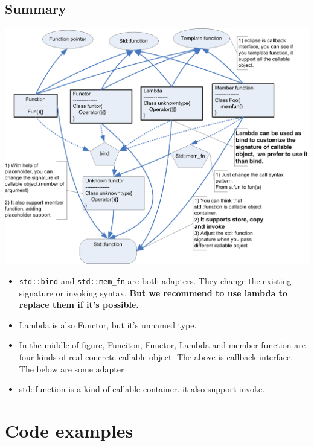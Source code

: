 \documentclass[a4paper,11pt,twoside]{book}
\begin{document}
\subsection{Summary}


\begin{center}
	\includegraphics[width=0.95\linewidth]{pics/callable.png}
\end{center}
	
	


\begin{itemize}
\item \texttt{std::bind} and \texttt{std::mem\_fn} are both adapters. They change the existing signature or invoking syntax. \textbf{But we recommend to use lambda to replace them if it's possible.}


\item Lambda is also Functor, but it's unnamed type.

\item In the middle of figure, Funciton, Functor, Lambda and member function are four kinds of real concrete callable object. The above is callback interface. The below are some adapter 

\item std::function is a kind of callable container. it also support invoke.
\end{itemize}

\section{Code examples}
\end{document}
